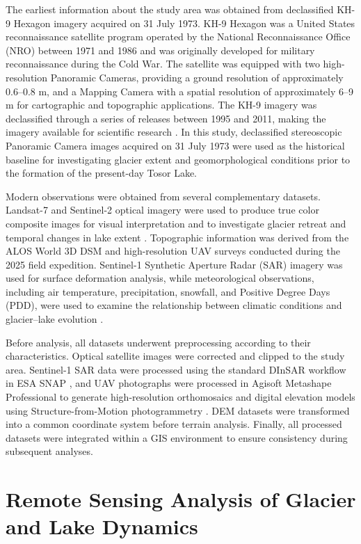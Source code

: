 \documentclass[12pt,a4paper]{report}
\begin{document}
The earliest information about the study area was obtained from declassified KH-9 Hexagon imagery acquired on 31 July 1973. KH-9 Hexagon was a United States reconnaissance satellite program operated by the National Reconnaissance Office (NRO) between 1971 and 1986 and was originally developed for military reconnaissance during the Cold War. The satellite was equipped with two high-resolution Panoramic Cameras, providing a ground resolution of approximately 0.6–0.8 m, and a Mapping Camera with a spatial resolution of approximately 6–9 m for cartographic and topographic applications. The KH-9 imagery was declassified through a series of releases between 1995 and 2011, making the imagery available for scientific research \cite{Surazakov2010, Dehecq2020}. In this study, declassified stereoscopic Panoramic Camera images acquired on 31 July 1973 were used as the historical baseline for investigating glacier extent and geomorphological conditions prior to the formation of the present-day Tosor Lake.

Modern observations were obtained from several complementary datasets. Landsat-7 and Sentinel-2 optical imagery were used to produce true color composite images for visual interpretation and to investigate glacier retreat and temporal changes in lake extent \cite{Drusch2012}. Topographic information was derived from the ALOS World 3D DSM and high-resolution UAV surveys conducted during the 2025 field expedition. Sentinel-1 Synthetic Aperture Radar (SAR) imagery was used for surface deformation analysis, while meteorological observations, including air temperature, precipitation, snowfall, and Positive Degree Days (PDD), were used to examine the relationship between climatic conditions and glacier–lake evolution \cite{Torres2012, Huss2018}.

Before analysis, all datasets underwent preprocessing according to their characteristics. Optical satellite images were corrected and clipped to the study area. Sentinel-1 SAR data were processed using the standard DInSAR workflow in ESA SNAP \cite{ESA2022}, and UAV photographs were processed in Agisoft Metashape Professional to generate high-resolution orthomosaics and digital elevation models using Structure-from-Motion photogrammetry \cite{Westoby2012}. DEM datasets were transformed into a common coordinate system before terrain analysis. Finally, all processed datasets were integrated within a GIS environment to ensure consistency during subsequent analyses.

\section{Remote Sensing Analysis of Glacier and Lake Dynamics}
\end{document}
